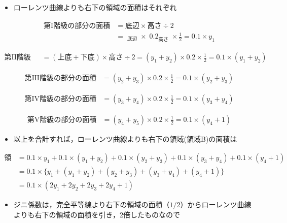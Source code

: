 \documentclass[
]{book}
\providecommand{\tightlist}{%
  \setlength{\itemsep}{0pt}\setlength{\parskip}{0pt}}
\theoremstyle{definition}
\theoremstyle{definition}
\theoremstyle{definition}
\theoremstyle{definition}
\theoremstyle{remark}
\begin{document}
\begin{itemize}
\tightlist
\item
  ローレンツ曲線よりも右下の領域の面積はそれぞれ
\end{itemize}

\begin{align*}
\text{第I階級の部分の面積}
&=
\text{底辺}\times\text{高さ}\div 2 \\
&=
\mathop{y_1}_{\text{底辺}} \times \mathop{0.2}_{\text{高さ}} \times \frac{1}{2} =0.1 \times y_1
\end{align*}

\begin{align*}
\text{第II階級の部分の面積}
&=
(\text{上底}+\text{下底})\times\text{高さ}\div 2
=(y_1+y_2) \times 0.2 \times \frac{1}{2}=0.1 \times (y_1+y_2)
\end{align*}

\begin{align*}
\text{第III階級の部分の面積}
&
=
(y_2+y_3) \times 0.2 \times \frac{1}{2}=0.1 \times (y_2+y_3)
\end{align*}

\begin{align*}
\text{第IV階級の部分の面積}
&
=
(y_3+y_4) \times 0.2 \times \frac{1}{2}=0.1 \times (y_3+y_4)
\end{align*}

\begin{align*}
\text{第V階級の部分の面積}
&
=(y_4+y_5) \times 0.2 \times \frac{1}{2} =0.1 \times (y_4+1)
\end{align*}

\begin{itemize}
\tightlist
\item
  以上を合計すれば，ローレンツ曲線よりも右下の領域(領域B)の面積は
\end{itemize}

\begin{align*}
\text{領域Bの面積}&=
0.1 \times y_1
+0.1 \times (y_1+y_2)
+0.1 \times (y_2+y_3)
+0.1 \times (y_3+y_4)
+0.1 \times (y_4+1) \\
&=0.1 \times \{ y_1+(y_1+y_2)+(y_2+y_3)+(y_3+y_4)+(y_4+1) \} \\
&=0.1 \times ( 2y_1+2 y_2+2 y_3+2 y_4 +1 )
\end{align*}

\begin{itemize}
\tightlist
\item
  ジニ係数は，完全平等線より右下の領域の面積（\(1/2\)）からローレンツ曲線よりも右下の領域の面積を引き，2倍したものなので
\end{itemize}
\end{document}

